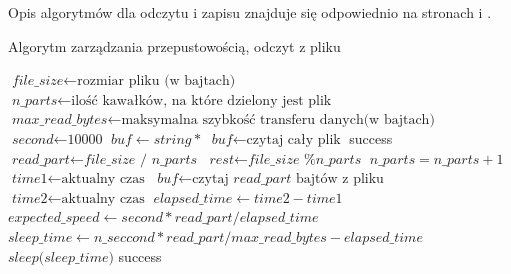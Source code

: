 Opis algorytmów dla odczytu i zapisu znajduje się odpowiednio na stronach \pageref{readalg} i \pageref{writealg}.
\begin{algorithm}
 \caption{Algorytm zarządzania przepustowością, odczyt z pliku}\label{readalg}
 \begin{algorithmic}[1]
  \STATE $\textit{file\_size} \gets \text{rozmiar pliku (w bajtach)}$
  \STATE $\textit{n\_parts} \gets \text{ilość kawałków, na które dzielony jest plik}$
  \STATE $\textit{max\_read\_bytes} \gets \text{maksymalna szybkość transferu danych(w bajtach)}$ 
  \STATE $\textit{second} \gets \textit{10000}$
  \STATE $\textit{buf} \gets string *$
    \STATE $\textit{buf} \gets \text{czytaj cały plik}$
    \RETURN success
  \ENDIF
  \STATE $\textit{read\_part} \gets \textit{file\_size / n\_parts}$
  \STATE $\textit{rest} \gets \textit{file\_size \% n\_parts}$
    \STATE $\textit{n\_parts} = \textit{n\_parts} + 1$
  \ENDIF
    \STATE $\textit{time1} \gets \text{aktualny czas}$
    \STATE $\textit{buf} \gets \text{czytaj } \textit{read\_part} \text{ bajtów z pliku}$
    \STATE $\textit{time2} \gets \text{aktualny czas}$
    \STATE $\textit{elapsed\_time} \gets \textit{time2} - \textit{time1}$
    \STATE $\textit{expected\_speed} \gets \textit{second} * \textit{read\_part} / \textit{elapsed\_time}$
    \STATE $\textit{sleep\_time} \gets \textit{n\_seccond} * \textit{read\_part} / \textit{max\_read\_bytes} - \textit{elapsed\_time}$
    \STATE $\textit{sleep(sleep\_time)}$
    \ENDIF
  \ENDFOR
  \RETURN success

 \end{algorithmic}
 \end{algorithm}
 
